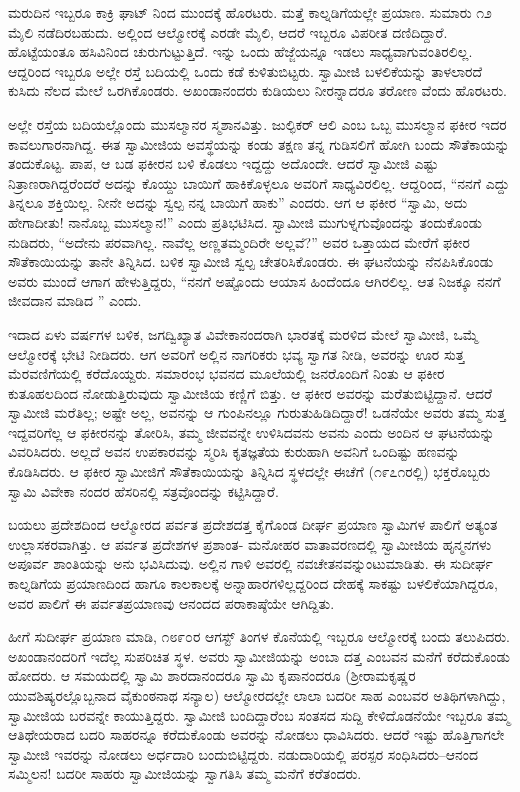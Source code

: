 ಮರುದಿನ ಇಬ್ಬರೂ ಕಾಕ್ರಿ ಘಾಟ್ ನಿಂದ ಮುಂದಕ್ಕೆ ಹೊರಟರು. ಮತ್ತೆ ಕಾಲ್ನಡಿಗೆಯಲ್ಲೇ ಪ್ರಯಾಣ. ಸುಮಾರು ೧೨ ಮೈಲಿ ನಡೆದಿರಬಹುದು. ಅಲ್ಲಿಂದ ಆಲ್ಮೋರಕ್ಕೆ ಎರಡೇ ಮೈಲಿ, ಆದರೆ ಇಬ್ಬರೂ ವಿಪರೀತ ದಣಿದಿದ್ದಾರೆ. ಹೊಟ್ಟೆಯಂತೂ ಹಸಿವಿನಿಂದ ಚುರುಗುಟ್ಟುತ್ತಿದೆ. ಇನ್ನು ಒಂದು ಹೆಜ್ಜೆಯನ್ನೂ ಇಡಲು ಸಾಧ್ಯವಾಗುವಂತಿರಲಿಲ್ಲ. ಆದ್ದರಿಂದ ಇಬ್ಬರೂ ಅಲ್ಲೇ ರಸ್ತೆ ಬದಿಯಲ್ಲಿ ಒಂದು ಕಡೆ ಕುಳಿತುಬಿಟ್ಟರು. ಸ್ವಾಮೀಜಿ ಬಳಲಿಕೆಯನ್ನು ತಾಳಲಾರದೆ ಕುಸಿದು ನೆಲದ ಮೇಲೆ ಒರಗಿಕೊಂಡರು. ಅಖಂಡಾನಂದರು ಕುಡಿಯಲು ನೀರನ್ನಾದರೂ ತರೋಣ ವೆಂದು ಹೊರಟರು.

ಅಲ್ಲೇ ರಸ್ತೆಯ ಬದಿಯಲ್ಲೊಂದು ಮುಸಲ್ಮಾನರ ಸ್ಮಶಾನವಿತ್ತು. ಜುಲ್ಫಿಕರ್ ಆಲಿ ಎಂಬ ಒಬ್ಬ ಮುಸಲ್ಮಾನ ಫಕೀರ ಇದರ ಕಾವಲುಗಾರನಾಗಿದ್ದ. ಈತ ಸ್ವಾಮೀಜಿಯ ಅವಸ್ಥೆಯನ್ನು ಕಂಡು ತಕ್ಷಣ ತನ್ನ ಗುಡಿಸಲಿಗೆ ಹೋಗಿ ಬಂದು ಸೌತೆಕಾಯನ್ನು ತಂದುಕೊಟ್ಟ. ಪಾಪ, ಆ ಬಡ ಫಕೀರನ ಬಳಿ ಕೊಡಲು ಇದ್ದದ್ದು ಅದೊಂದೇ. ಆದರೆ ಸ್ವಾಮೀಜಿ ಎಷ್ಟು ನಿತ್ರಾಣರಾಗಿದ್ದರೆಂದರೆ ಅದನ್ನು ಕೊಯ್ದು ಬಾಯಿಗೆ ಹಾಕಿಕೊಳ್ಳಲೂ ಅವರಿಗೆ ಸಾಧ್ಯವಿರಲಿಲ್ಲ. ಆದ್ದರಿಂದ, “ನನಗೆ ಎದ್ದು ತಿನ್ನಲೂ ಶಕ್ತಿಯಿಲ್ಲ. ನೀನೇ ಅದನ್ನು ಸ್ವಲ್ಪ ನನ್ನ ಬಾಯಿಗೆ ಹಾಕು” ಎಂದರು. ಆಗ ಆ ಫಕೀರ “ಸ್ವಾಮಿ, ಅದು ಹೇಗಾದೀತು! ನಾನೊಬ್ಬ ಮುಸಲ್ಮಾನ!” ಎಂದು ಪ್ರತಿಭಟಿಸಿದ. ಸ್ವಾಮೀಜಿ ಮುಗುಳ್ನಗುವೊಂದನ್ನು ತಂದುಕೊಂಡು ನುಡಿದರು, “ಅದೇನು ಪರವಾಗಿಲ್ಲ. ನಾವೆಲ್ಲ ಅಣ್ಣತಮ್ಮಂದಿರೇ ಅಲ್ಲವೆ?” ಅವರ ಒತ್ತಾಯದ ಮೇರೆಗೆ ಫಕೀರ ಸೌತೆಕಾಯಿಯನ್ನು ತಾನೇ ತಿನ್ನಿಸಿದ. ಬಳಿಕ ಸ್ವಾಮೀಜಿ ಸ್ವಲ್ಪ ಚೇತರಿಸಿಕೊಂಡರು. ಈ ಘಟನೆಯನ್ನು ನೆನಪಿಸಿಕೊಂಡು ಅವರು ಮುಂದೆ ಆಗಾಗ ಹೇಳುತ್ತಿದ್ದರು, “ನನಗೆ ಅಷ್ಟೊಂದು ಆಯಾಸ ಹಿಂದೆಂದೂ ಆಗಿರಲಿಲ್ಲ. ಆತ ನಿಜಕ್ಕೂ ನನಗೆ ಜೀವದಾನ ಮಾಡಿದ ” ಎಂದು.

ಇದಾದ ಏಳು ವರ್ಷಗಳ ಬಳಿಕ, ಜಗದ್ವಿಖ್ಯಾತ ವಿವೇಕಾನಂದರಾಗಿ ಭಾರತಕ್ಕೆ ಮರಳಿದ ಮೇಲೆ ಸ್ವಾಮೀಜಿ, ಒಮ್ಮೆ ಆಲ್ಮೋರಕ್ಕೆ ಭೇಟಿ ನೀಡಿದರು. ಆಗ ಅವರಿಗೆ ಅಲ್ಲಿನ ನಾಗರಿಕರು ಭವ್ಯ ಸ್ವಾಗತ ನೀಡಿ, ಅವರನ್ನು ಊರ ಸುತ್ತ ಮೆರವಣಿಗೆಯಲ್ಲಿ ಕರೆದೊಯ್ದರು. ಸಮಾರಂಭ ಭವನದ ಮೂಲೆಯಲ್ಲಿ ಜನರೊಂದಿಗೆ ನಿಂತು ಆ ಫಕೀರ ಕುತೂಹಲದಿಂದ ನೋಡುತ್ತಿರುವುದು ಸ್ವಾಮೀಜಿಯ ಕಣ್ಣಿಗೆ ಬಿತ್ತು. ಆ ಫಕೀರ ಅವರನ್ನು ಮರೆತುಬಿಟ್ಟಿದ್ದಾನೆ. ಆದರೆ ಸ್ವಾಮೀಜಿ ಮರೆತಿಲ್ಲ; ಅಷ್ಟೇ ಅಲ್ಲ, ಅವನನ್ನು ಆ ಗುಂಪಿನಲ್ಲೂ ಗುರುತುಹಿಡಿದಿದ್ದಾರೆ! ಒಡನೆಯೇ ಅವರು ತಮ್ಮ ಸುತ್ತ ಇದ್ದವರಿಗೆಲ್ಲ ಆ ಫಕೀರನನ್ನು ತೋರಿಸಿ, ತಮ್ಮ ಜೀವವನ್ನೇ ಉಳಿಸಿದವನು ಅವನು ಎಂದು ಅಂದಿನ ಆ ಘಟನೆಯನ್ನು ವಿವರಿಸಿದರು. ಅಲ್ಲದೆ ಅವನ ಉಪಕಾರವನ್ನು ಸ್ಮರಿಸಿ ಕೃತಜ್ಞತೆಯ ಕುರುಹಾಗಿ ಅವನಿಗೆ ಒಂದಿಷ್ಟು ಹಣವನ್ನು ಕೊಡಿಸಿದರು. ಆ ಫಕೀರ ಸ್ವಾಮೀಜಿಗೆ ಸೌತೆಕಾಯಿಯನ್ನು ತಿನ್ನಿಸಿದ ಸ್ಥಳದಲ್ಲೇ ಈಚೆಗೆ (೧೯೭೧ರಲ್ಲಿ) ಭಕ್ತರೊಬ್ಬರು ಸ್ವಾಮಿ ವಿವೇಕಾ ನಂದರ ಹೆಸರಿನಲ್ಲಿ ಸತ್ರವೊಂದನ್ನು ಕಟ್ಟಿಸಿದ್ದಾರೆ.

ಬಯಲು ಪ್ರದೇಶದಿಂದ ಆಲ್ಮೋರದ ಪರ್ವತ ಪ್ರದೇಶದತ್ತ ಕೈಗೊಂಡ ದೀರ್ಘ ಪ್ರಯಾಣ ಸ್ವಾಮಿಗಳ ಪಾಲಿಗೆ ಅತ್ಯಂತ ಉಲ್ಲಾಸಕರವಾಗಿತ್ತು. ಆ ಪರ್ವತ ಪ್ರದೇಶಗಳ ಪ್ರಶಾಂತ- ಮನೋಹರ ವಾತಾವರಣದಲ್ಲಿ ಸ್ವಾಮೀಜಿಯ ಹೃನ್ಮನಗಳು ಅಪೂರ್ವ ಶಾಂತಿಯನ್ನು ಅನು ಭವಿಸಿದುವು. ಅಲ್ಲಿನ ಗಾಳಿ ಅವರಲ್ಲಿ ನವಚೇತನವನ್ನುಂಟುಮಾಡಿತು. ಈ ಸುದೀರ್ಘ ಕಾಲ್ನಡಿಗೆಯ ಪ್ರಯಾಣದಿಂದ ಹಾಗೂ ಕಾಲಕಾಲಕ್ಕೆ ಅನ್ನಾಹಾರಗಳಿಲ್ಲದ್ದರಿಂದ ದೇಹಕ್ಕೆ ಸಾಕಷ್ಟು ಬಳಲಿಕೆಯಾಗಿದ್ದರೂ, ಅವರ ಪಾಲಿಗೆ ಈ ಪರ್ವತಪ್ರಯಾಣವು ಆನಂದದ ಪರಾಕಾಷ್ಠೆಯೇ ಆಗಿದ್ದಿತು.

ಹೀಗೆ ಸುದೀರ್ಘ ಪ್ರಯಾಣ ಮಾಡಿ, ೧೮೯೦ರ ಆಗಸ್ಟ್ ತಿಂಗಳ ಕೊನೆಯಲ್ಲಿ ಇಬ್ಬರೂ ಆಲ್ಮೋರಕ್ಕೆ ಬಂದು ತಲುಪಿದರು. ಅಖಂಡಾನಂದರಿಗೆ ಇದೆಲ್ಲ ಸುಪರಿಚಿತ ಸ್ಥಳ. ಅವರು ಸ್ವಾಮೀಜಿಯನ್ನು ಅಂಬಾ ದತ್ತ ಎಂಬವನ ಮನೆಗೆ ಕರೆದುಕೊಂಡು ಹೋದರು. ಆ ಸಮಯದಲ್ಲಿ ಸ್ವಾಮಿ ಶಾರದಾನಂದರೂ ಸ್ವಾಮಿ ಕೃಪಾನಂದರೂ (ಶ್ರೀರಾಮಕೃಷ್ಣರ ಯುವಶಿಷ್ಯರಲ್ಲೊಬ್ಬನಾದ ವೈಕುಂಠನಾಥ ಸನ್ಯಾಲ) ಆಲ್ಮೋರದಲ್ಲೇ ಲಾಲಾ ಬದರೀ ಸಾಹ ಎಂಬವರ ಅತಿಥಿಗಳಾಗಿದ್ದು, ಸ್ವಾಮೀಜಿಯ ಬರವನ್ನೇ ಕಾಯುತ್ತಿದ್ದರು. ಸ್ವಾಮೀಜಿ ಬಂದಿದ್ದಾರೆಂಬ ಸಂತಸದ ಸುದ್ದಿ ಕೇಳಿದೊಡನೆಯೇ ಇಬ್ಬರೂ ತಮ್ಮ ಆತಿಥೇಯರಾದ ಬದರಿ ಸಾಹರನ್ನೂ ಕರೆದುಕೊಂಡು ಅವರನ್ನು ನೋಡಲು ಧಾವಿಸಿದರು. ಆದರೆ ಇಷ್ಟು ಹೊತ್ತಿಗಾಗಲೇ ಸ್ವಾಮೀಜಿ ಇವರನ್ನು ನೋಡಲು ಅರ್ಧದಾರಿ ಬಂದುಬಿಟ್ಟಿದ್ದರು. ನಡುದಾರಿಯಲ್ಲಿ ಪರಸ್ಪರ ಸಂಧಿಸಿದರು–ಆನಂದ ಸಮ್ಮಿಲನ! ಬದರೀ ಸಾಹರು ಸ್ವಾಮೀಜಿಯನ್ನು ಸ್ವಾಗತಿಸಿ ತಮ್ಮ ಮನೆಗೆ ಕರೆತಂದರು.

